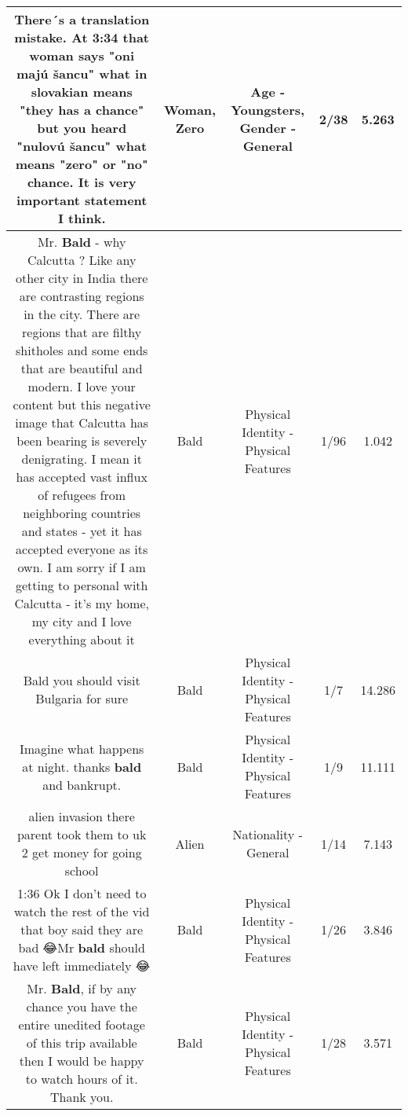 \documentclass[11pt]{article}
\newlength\mylength
\begin{document}
\begin{center}
\begin{longtable}{|C{.65\mylength}|C{.30\mylength}|C{.12\mylength}|C{.12\mylength}|C{.12\mylength}|}
  \small There´s a translation mistake. At 3:34 that \textbf{woman} says "oni majú šancu" what in slovakian means "they has a chance" but you heard "nulovú šancu" what means "\textbf{zero}" or "no" chance. It is very important statement I think.\normalsize   & Woman, Zero & Age - Youngsters, Gender - General & 2/38 & 5.263 \\  \hline
  \small Mr. \textbf{Bald} - why Calcutta ? Like any other city in India there are contrasting regions in the city. There are regions that are filthy shitholes and some ends that are beautiful and modern. I love your content but this negative image that Calcutta has been bearing is severely denigrating. I mean it has accepted vast influx of refugees from neighboring countries and states - yet it has accepted everyone as its own. I am sorry if I am getting to personal with Calcutta - it's my home, my city and I love everything about it\normalsize   & Bald & Physical Identity - Physical Features & 1/96 & 1.042 \\  \hline
  \small Bald you should visit Bulgaria for sure\normalsize   & Bald & Physical Identity - Physical Features & 1/7 & 14.286 \\  \hline
  \small Imagine what happens at night. thanks \textbf{bald} and bankrupt.\normalsize   & Bald & Physical Identity - Physical Features & 1/9 & 11.111 \\  \hline
  \small alien invasion there parent took them to uk 2 get money for going school\normalsize   & Alien & Nationality - General & 1/14 & 7.143 \\  \hline
  \small 1:36 Ok I don't need to watch the rest of the vid that boy said they are bad 😂Mr \textbf{bald} should have left immediately 😂\normalsize   & Bald & Physical Identity - Physical Features & 1/26 & 3.846 \\  \hline
  \small Mr. \textbf{Bald}, if by any chance you have the entire unedited footage of this trip available then I would be happy to watch hours of it. Thank you.\normalsize   & Bald & Physical Identity - Physical Features & 1/28 & 3.571 \\  \hline

\end{longtable}
\end{center}
\end{document}

